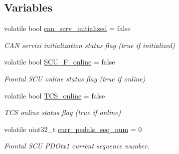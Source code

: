 \subsection*{Variables}
\begin{DoxyCompactItemize}
\item 
\mbox{\label{group___c_a_n__servizi__group_gaf351ebc02b2d28174f8e4b18ff9edf5f}} 
volatile bool \mbox{\hyperlink{group___c_a_n__servizi__group_gaf351ebc02b2d28174f8e4b18ff9edf5f}{can\+\_\+serv\+\_\+initialized}} = false
\begin{DoxyCompactList}\small\item\em C\+AN servizi initialization status flag (true if initialized) \end{DoxyCompactList}\item 
\mbox{\label{group___c_a_n__servizi__group_gafc26efcf97051372e70a8d0f2f0c79f0}} 
volatile bool \mbox{\hyperlink{group___c_a_n__servizi__group_gafc26efcf97051372e70a8d0f2f0c79f0}{S\+C\+U\+\_\+\+F\+\_\+online}} = false
\begin{DoxyCompactList}\small\item\em Frontal S\+CU online status flag (true if online) \end{DoxyCompactList}\item 
\mbox{\label{group___c_a_n__servizi__group_gad3e88db55b4105026b7e451f853a796b}} 
volatile bool \mbox{\hyperlink{group___c_a_n__servizi__group_gad3e88db55b4105026b7e451f853a796b}{T\+C\+S\+\_\+online}} = false
\begin{DoxyCompactList}\small\item\em T\+CS online status flag (true if online) \end{DoxyCompactList}\item 
\mbox{\label{group___c_a_n__servizi__group_gacad002b7cb06bffa8811859e6f53cb28}} 
volatile uint32\+\_\+t \mbox{\hyperlink{group___c_a_n__servizi__group_gacad002b7cb06bffa8811859e6f53cb28}{curr\+\_\+pedals\+\_\+seq\+\_\+num}} = 0
\begin{DoxyCompactList}\small\item\em Frontal S\+CU P\+D\+Otx1 current sequence number. \end{DoxyCompactList}\item 
\mbox{\label{group___c_a_n__servizi__group_gadcbd4ad67b50cf61731266bf5c5ba158}} 

\end{DoxyCompactItemize}
